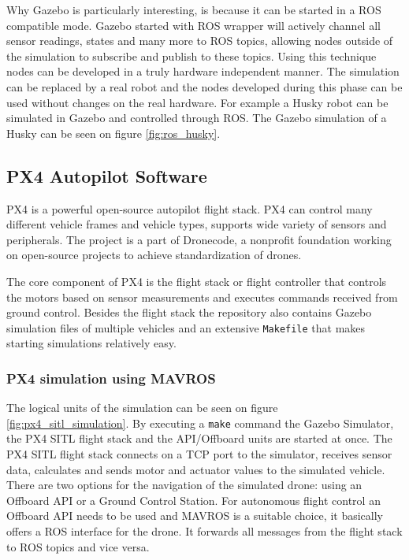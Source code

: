 Why Gazebo is particularly interesting, is because it can be started in a ROS compatible mode. Gazebo
started with ROS wrapper will actively channel all sensor readings, states and many more to ROS topics, 
allowing nodes outside of the simulation to subscribe and publish to these topics. Using this technique nodes 
can be developed in a truly hardware independent manner. The simulation can be replaced by a real robot
and the nodes developed during this phase can be used without changes on the real hardware. For example a 
Husky robot can be simulated in Gazebo and controlled through ROS. The Gazebo simulation of a Husky 
can be seen on figure \ref{fig:ros_husky}.


\subsection{PX4 Autopilot Software}
PX4 is a powerful open-source autopilot flight stack. PX4 can control many different vehicle frames and vehicle 
types, supports wide variety of sensors and peripherals. The project is a part of Dronecode, a nonprofit
foundation working on open-source projects to achieve standardization of drones.\cite{PX4Website} 

The core component of PX4 is the flight stack or flight controller that controls the motors based on sensor
measurements and executes commands received from ground control. Besides the flight stack the repository 
also contains Gazebo simulation files of multiple vehicles and an extensive \verb|Makefile| that makes 
starting simulations relatively easy. 

\subsubsection{PX4 simulation using MAVROS}
The logical units of the simulation can be seen on figure \ref{fig:px4_sitl_simulation}.
By executing a \verb|make| command the Gazebo Simulator, the PX4 SITL flight stack and the API/Offboard units
are started at once. The PX4 SITL flight stack connects on a TCP port to the simulator, receives sensor data, 
calculates and sends motor and actuator values to the simulated vehicle. There are two options for the navigation
of the simulated drone: using an Offboard API or a Ground Control Station. For autonomous flight control an 
Offboard API needs to be used and MAVROS is a suitable choice, it basically offers a ROS interface for 
the drone. It forwards all messages from the flight stack to ROS topics and vice versa.


